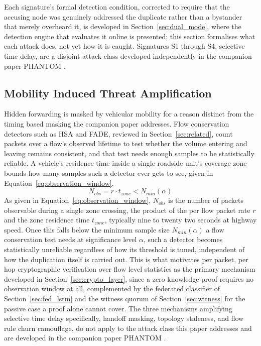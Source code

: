 \documentclass[final,5p,twocolumn]{elsarticle}
\theoremstyle{remark}
\theoremstyle{plain}
\begin{document}
Each signature's formal detection condition, corrected to require that
the accusing node was genuinely addressed the duplicate rather than a
bystander that merely overheard it, is developed in
Section~\ref{sec:dual_mode}, where the detection engine that evaluates
it online is presented; this section formalises what each attack does,
not yet how it is caught. Signatures S1 through S4, selective time
delay, are a disjoint attack class developed independently in the
companion paper PHANTOM \cite{Phantom2026}.

\subsection{Mobility Induced Threat Amplification}
\label{sec:mobility_amplification}

Hidden forwarding is masked by vehicular mobility for a reason distinct
from the timing based masking the companion paper addresses. Flow
conservation detectors such as HSA and FADE, reviewed in
Section~\ref{sec:related}, count packets over a flow's observed lifetime
to test whether the volume entering and leaving remains consistent, and
that test needs enough samples to be statistically reliable. A vehicle's
residence time inside a single roadside unit's coverage zone bounds how
many samples such a detector ever gets to see, given in
Equation~\eqref{eq:observation_window}.
\begin{equation}
	N_{obs} = r \cdot t_{zone} < N_{min}(\alpha)
	\label{eq:observation_window}
\end{equation}
As given in Equation~\eqref{eq:observation_window}, $N_{obs}$ is the
number of packets observable during a single zone crossing, the product
of the per flow packet rate $r$ and the zone residence time $t_{zone}$,
typically nine to twenty two seconds at highway speed. Once this falls
below the minimum sample size $N_{min}(\alpha)$ a flow conservation test
needs at significance level $\alpha$, such a detector becomes
statistically unreliable regardless of how its threshold is tuned,
independent of how the duplication itself is carried out. This is what
motivates per packet, per hop cryptographic verification over flow level
statistics as the primary mechanism developed in
Section~\ref{sec:crypto_layer}, since a zero knowledge proof requires no
observation window at all, complemented by the federated classifier of
Section~\ref{sec:fed_lstm} and the witness quorum of
Section~\ref{sec:witness} for the passive case a proof alone cannot
cover. The three mechanisms amplifying selective time delay specifically,
handoff masking, topology staleness, and flow rule churn camouflage, do
not apply to the attack class this paper addresses and are developed in
the companion paper PHANTOM \cite{Phantom2026}.
\end{document}
